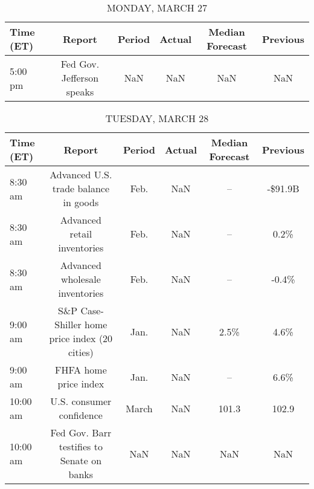 \documentclass{article}%
\begin{document}
%
\normalsize%


\begin{table}[htbp]%
\caption{MONDAY, MARCH 27}%
\centering%
\begin{adjustbox}{width=1\textwidth}%
\begin{tabular}{lccccc}
\toprule
Time (ET) &                    Report & Period & Actual & Median Forecast & Previous \\
\midrule
  5:00 pm & Fed Gov. Jefferson speaks &    NaN &    NaN &             NaN &      NaN \\
\bottomrule
\end{tabular}
%
\end{adjustbox}%
\end{table}

%


\begin{table}[htbp]%
\caption{TUESDAY, MARCH 28}%
\centering%
\begin{adjustbox}{width=1\textwidth}%
\begin{tabular}{lccccc}
\toprule
Time (ET) &                                        Report & Period & Actual & Median Forecast & Previous \\
\midrule
  8:30 am &          Advanced U.S. trade balance in goods &   Feb. &    NaN &              -- &  -\$91.9B \\
  8:30 am &                   Advanced retail inventories &   Feb. &    NaN &              -- &     0.2\% \\
  8:30 am &                Advanced wholesale inventories &   Feb. &    NaN &              -- &    -0.4\% \\
  9:00 am & S\&P Case-Shiller home price index (20 cities) &   Jan. &    NaN &            2.5\% &     4.6\% \\
  9:00 am &                         FHFA home price index &   Jan. &    NaN &              -- &     6.6\% \\
 10:00 am &                      U.S. consumer confidence &  March &    NaN &           101.3 &    102.9 \\
 10:00 am &    Fed Gov. Barr testifies to Senate on banks &    NaN &    NaN &             NaN &      NaN \\
\bottomrule
\end{tabular}
%
\end{adjustbox}%
\end{table}

%
\end{document}
